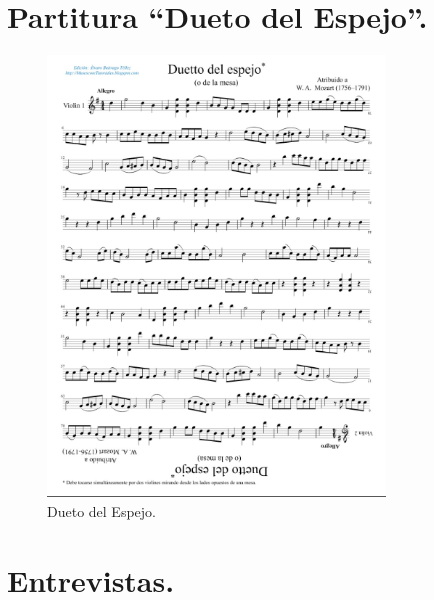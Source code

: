 \documentclass[a4paper, openright, 11pt, titlepage]{report}
\theoremstyle{definition}\newtheorem{defin}[propo]{Definition}
\theoremstyle{definition}\newtheorem{obser}[propo]{Remark}
\theoremstyle{definition}\newtheorem{ejem}[propo]{Ejemplo}
\theoremstyle{definition}\newtheorem{algoritmo}[propo]{Algoritmo}
\begin{document}
\chapter{Partitura ``Dueto del Espejo''.}
\begin{figure}[H]
    \centering
    \includegraphics[width = 0.8\textwidth]{Images/Apéndices/Apéndice C/duettoMozart.png}
    \caption{Dueto del Espejo.}
    \label{fig:my_label}
\end{figure}
\chapter{Entrevistas.}
\end{document}
